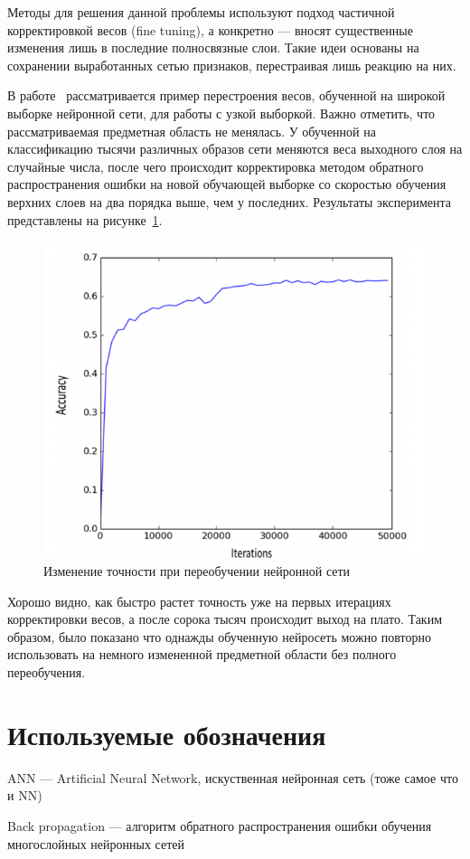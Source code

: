 \documentclass[a4paper,14pt]{extarticle} %
\begin{document}
Методы для решения данной проблемы используют подход частичной корректировкой весов (fine tuning), а конкретно --- вносят существенные изменения лишь в последние полносвязные слои. Такие идеи основаны на сохранении выработанных сетью признаков, перестраивая лишь реакцию на них.

В работе~\cite{reyes2015fine} рассматривается пример перестроения весов, обученной на широкой выборке нейронной сети, для работы с узкой выборкой. Важно отметить, что рассматриваемая предметная область не менялась. У обученной на классификацию тысячи различных образов сети меняются веса выходного слоя на случайные числа, после чего происходит корректировка методом обратного распространения ошибки на новой обучающей выборке со скоростью обучения верхних слоев на два порядка выше, чем у последних. Результаты эксперимента представлены на рисунке~\ref{fig:fine-tuning}. 

\begin{figure}[h]
\centering
\includegraphics[width=0.525\linewidth]{fine-tuning}
\caption{Изменение точности при переобучении нейронной сети}
\label{fig:fine-tuning}
\end{figure}

Хорошо видно, как быстро растет точность уже на первых итерациях корректировки весов, а после сорока тысяч происходит выход на плато. Таким образом, было показано что однажды обученную нейросеть можно повторно использовать на немного измененной предметной области без полного переобучения.

\newpage
\section*{Используемые обозначения}
ANN --- Artificial Neural Network, искуственная нейронная сеть (тоже самое что и NN)

\noindent Back propagation --- алгоритм обратного распространения ошибки обучения многослойных нейронных сетей 
\end{document}
